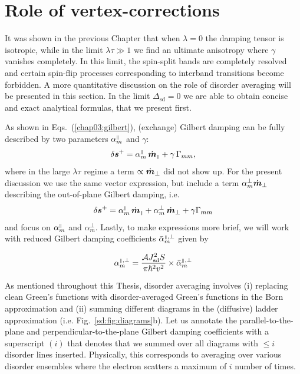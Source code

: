 \section{Role of vertex-corrections}
It was shown in the previous Chapter that when $\lambda=0$ the damping tensor is isotropic, while in the limit $\lambda\tau\gg 1$ we find an ultimate anisotropy where $\gamma$ vanishes completely. In this limit, the spin-split bands are completely resolved and certain spin-flip processes corresponding to interband transitions become forbidden. A more quantitative discussion on the role of disorder averaging will be presented in this section. In the limit $\Delta_\text{sd}=0$ we are able to obtain concise and exact analytical formulas, that we present first. 


As shown in Eqs.~(\ref{chap03:gilbert}), (exchange) Gilbert damping can be fully described by two parameters $\alpha_m^{{\scriptscriptstyle\parallel}}$ and $\gamma$: 
\begin{equation}
\delta\boldsymbol{s}^+ = \alpha_m^{{\scriptscriptstyle\parallel}}\, \dot{\boldsymbol{m}}_{{\scriptscriptstyle\parallel}} + \gamma\, \Gamma_{mm},
\end{equation}
where in the large $\lambda\tau$ regime a term $\propto \dot{\boldsymbol{m}}_\perp$ did not show up. For the present discussion we use the same vector expression, but include a term $\alpha_m^\perp\dot{\boldsymbol{m}}_\perp$ describing the out-of-plane Gilbert damping, i.e.
\begin{equation}
\delta\boldsymbol{s}^+  = \alpha_m^{{\scriptscriptstyle\parallel}}\,\dot{\boldsymbol{m}}_{\scriptscriptstyle\parallel} + \alpha_m^{\perp}\,\dot{\boldsymbol{m}}_{\perp} + \gamma\Gamma_{mm} 
\end{equation}and focus on $\alpha_m^{{\scriptscriptstyle\parallel}}$ and $\alpha_m^{\perp}$. Lastly, to make expressions more brief, we will work with reduced Gilbert damping coefficients $\bar{\alpha}_m^{{\scriptscriptstyle\parallel},\perp}$ given by


\begin{equation}
    \alpha_m^{{\scriptscriptstyle\parallel},\perp} = \frac{\mathcal{A}J_\text{sd}^2S}{\pi\hbar^2v^2}\times\bar{\alpha}_m^{{\scriptscriptstyle\parallel},\perp}  
\end{equation}

As mentioned throughout this Thesis, disorder averaging involves (i) replacing clean Green's functions with disorder-averaged Green's functions in the Born approximation and (ii) summing different diagrams in the (diffusive) ladder approximation (i.e. Fig.~\ref{sd:fig:diagrams}b). Let us annotate the parallel-to-the-plane and perpendicular-to-the-plane Gilbert damping coefficients with a superscript $(i)$ that denotes that we summed over all diagrams with $\leq i$ disorder lines inserted. Physically, this corresponds to averaging over various disorder ensembles where the electron scatters a maximum of $i$ number of times. 

